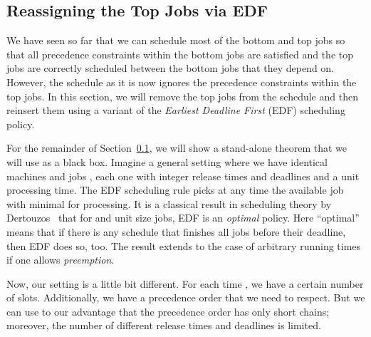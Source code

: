 \documentclass[11pt,letterpaper,oneside,english]{article}
\theoremstyle{theorem}
\begin{document}
\begin{comment}
We now account for the number of discarded jobs. We can take advantage of the ``gap'' between the levels of the top and bottom jobs, which ensures that top jobs are assigned to relatively few intervals compared to the bottom jobs. We can say that  contains  equally sized intervals, and by our choice of constants, . So by discarding  jobs for each of the  intervals , we discard only  jobs.}
\end{proof}
\end{comment}



\subsection{Reassigning the Top Jobs via EDF}\label{sec:ReassigningTopJobsViaEDF}

We have seen so far that we can schedule most of the bottom and top jobs so that 
all precedence constraints within the bottom jobs are satisfied and the
top jobs are correctly scheduled between the bottom jobs that they depend on. However, 
the schedule as it is now ignores the precedence constraints within the top jobs. 
In this section, we will remove the top jobs from the schedule and then reinsert them
using a variant of the \emph{Earliest Deadline First} (EDF) scheduling policy. 

For the remainder of Section~\ref{sec:ReassigningTopJobsViaEDF}, we will show a 
stand-alone theorem that we will use as a black box. Imagine a general setting where
we have  identical machines and  jobs , each one with integer release 
times  and deadlines  and a unit processing time. The EDF scheduling rule picks
at any time the available job with minimal  for processing.
It is a classical result in scheduling theory by Dertouzos~\cite{EDF-Dertouzos74} that for 
and unit size jobs, EDF is an \emph{optimal} policy. Here ``optimal'' means that if there
is any schedule that finishes all jobs before their deadline, then EDF does so, too.
The result extends to the case of arbitrary running times  if one allows \emph{preemption}.

Now, our setting is a little bit different. For each time , we have a certain number  of slots. Additionally, we have a precedence order that we need to respect. 
But we can use to our advantage that the precedence order has only short chains; moreover, the number of different release times and deadlines is limited. 
\end{document}
